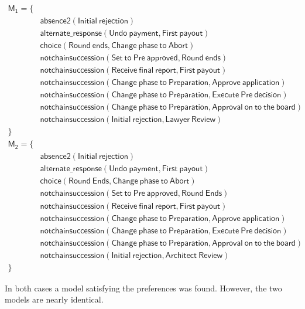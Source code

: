 \begin{align*}
\mathsf{M_1} = \{ & \\
 & \mathsf{absence2(Initial\ rejection)} \\
 & \mathsf{ alternate\_response(Undo\ payment, First\ payout)} \\
 & \mathsf{ choice(Round\ ends, Change\ phase\ to\ Abort)} \\
 & \mathsf{ notchainsuccession(Set\ to\ Pre\ approved, Round\ ends)} \\
 & \mathsf{ notchainsuccession(Receive\ final\ report, First\ payout)} \\
 & \mathsf{ notchainsuccession(Change\ phase\ to\ Preparation, Approve\ application)} \\
 & \mathsf{ notchainsuccession(Change\ phase\ to\ Preparation, Execute\ Pre\ decision)} \\
 & \mathsf{ notchainsuccession(Change\ phase\ to\ Preparation, Approval\ on\ to\ the\ board)} \\
 & \mathsf{ notchainsuccession(Initial\ rejection, Lawyer\ Review)} \\
 \} & \\
\mathsf{M_2} = \{ & \\
 & \mathsf{absence2(Initial\ rejection)} \\
 & \mathsf{ alternate\_response(Undo\ payment, First\ payout)} \\
 & \mathsf{ choice(Round\ Ends, Change\ phase\ to\ Abort)} \\
 & \mathsf{ notchainsuccession(Set\ to\ Pre\ approved, Round\ Ends)} \\
 & \mathsf{ notchainsuccession(Receive\ final\ report, First\ payout)} \\
 & \mathsf{ notchainsuccession(Change\ phase\ to\ Preparation, Approve\ application)} \\
 & \mathsf{ notchainsuccession(Change\ phase\ to\ Preparation, Execute\ Pre\ decision)} \\
 & \mathsf{ notchainsuccession(Change\ phase\ to\ Preparation, Approval\ on\ to\ the\ board)} \\
 & \mathsf{ notchainsuccession(Initial\ rejection, Architect\ Review)} \\
 \} & 
\end{align*}

In both cases a model satisfying the preferences was found. However, the two models are nearly identical.



